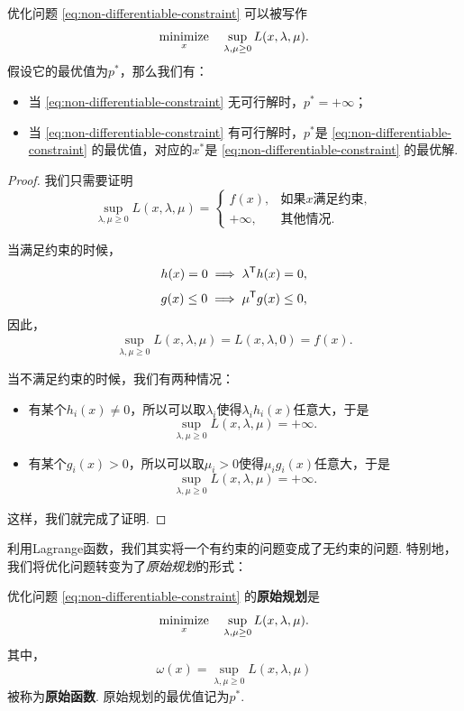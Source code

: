 \begin{proposition}\label{prop:lagrange-primal}
    优化问题 \eqref{eq:non-differentiable-constraint} 可以被写作
    \[\operatorname*{minimize}_{x}\quad \sup_{\lambda,\mu\geq 0} L(x,\lambda,\mu).\]
    假设它的最优值为$p^*$，那么我们有：
    \begin{itemize}
        \item 当 \eqref{eq:non-differentiable-constraint} 无可行解时，$p^*=+\infty$；
        \item 当 \eqref{eq:non-differentiable-constraint} 有可行解时，$p^*$是 \eqref{eq:non-differentiable-constraint} 的最优值，对应的$x^*$是 \eqref{eq:non-differentiable-constraint} 的最优解.
    \end{itemize}
\end{proposition}
\begin{proof}
    我们只需要证明
    \[\sup_{\lambda,\mu\geq 0} L(x,\lambda,\mu)=\begin{cases}
        f(x),&\text{如果$x$满足约束},\\
        +\infty,&\text{其他情况}.
    \end{cases}\]

    当满足约束的时候，
    \[h(x)=0\implies \lambda^{\mathsf{T}} h(x)=0,\]
    \[g(x)\leq 0\implies \mu^{\mathsf{T}} g(x)\leq 0,\]
    因此，
    \[\sup_{\lambda,\mu\geq 0} L(x,\lambda,\mu)=L(x,\lambda,0)=f(x).\]

    当不满足约束的时候，我们有两种情况：
    \begin{itemize}
        \item 有某个$h_i(x)\neq 0$，所以可以取$\lambda_i$使得$\lambda_i h_i(x)$任意大，于是
        \[\sup_{\lambda,\mu\geq 0} L(x,\lambda,\mu)=+\infty.\]
        \item 有某个$g_i(x)>0$，所以可以取$\mu_i>0$使得$\mu_i g_i(x)$任意大，于是
        \[\sup_{\lambda,\mu\geq 0} L(x,\lambda,\mu)=+\infty.\]
    \end{itemize}
    这样，我们就完成了证明. 
\end{proof}

利用Lagrange函数，我们其实将一个有约束的问题变成了无约束的问题. 特别地，我们将优化问题转变为了\textit{原始规划}的形式：

\begin{definition}[原始规划和原始函数]
    优化问题 \eqref{eq:non-differentiable-constraint} 的\textbf{原始规划}是
    \[\operatorname*{minimize}_{x}\quad \sup_{\lambda,\mu\geq 0} L(x,\lambda,\mu).\]
    其中，
    \[\omega(x)=\sup_{\lambda,\mu\geq 0} L(x,\lambda,\mu)\]
    被称为\textbf{原始函数}. 原始规划的最优值记为$p^*$.
\end{definition}

